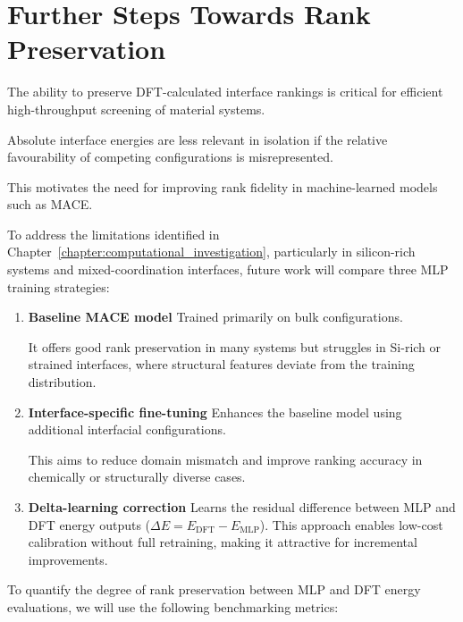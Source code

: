 \section{Further Steps Towards Rank Preservation} \label{section:rank_preservation}


The ability to preserve DFT-calculated interface rankings is critical for efficient high-throughput screening of
material systems.

Absolute interface energies are less relevant in isolation if the relative favourability of competing configurations is
misrepresented.

This motivates the need for improving rank fidelity in machine-learned models such as MACE.


To address the limitations identified in Chapter~\ref{chapter:computational_investigation}, particularly in silicon-rich
systems and mixed-coordination interfaces, future work will compare three MLP training strategies:


\begin{enumerate}
    \item \textbf{Baseline MACE model} Trained primarily on bulk configurations.

    It offers good rank preservation in many systems but struggles in Si-rich or strained interfaces, where structural
    features deviate from the training distribution.
    \item \textbf{Interface-specific fine-tuning} Enhances the baseline model using additional interfacial
    configurations.

    This aims to reduce domain mismatch and improve ranking accuracy in chemically or structurally diverse cases.
    \item \textbf{Delta-learning correction} Learns the residual difference between MLP and DFT energy outputs
    (\( \Delta E = E_\mathrm{DFT} - E_\mathrm{MLP} \)). This approach enables low-cost calibration without full
    retraining, making it attractive for incremental improvements.
\end{enumerate}


To quantify the degree of rank preservation between MLP and DFT energy evaluations, we will use the following
benchmarking metrics:


